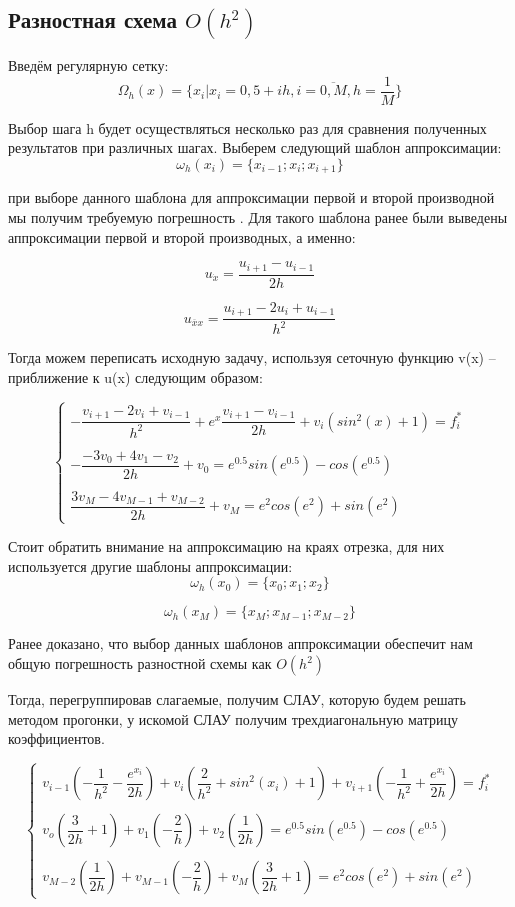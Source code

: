 \documentclass[12pt]{article}
\begin{document}
\subsection{Разностная схема $O(h^2)$}
Введём регулярную сетку:
$$
\Omega_h(x) = \{x_i | x_i = 0,5 + ih, i = \overline{0, M}, h = \dfrac{1}{M}\}
$$

Выбор шага h будет осуществляться несколько раз для сравнения полученных результатов при различных шагах.
Выберем следующий шаблон аппроксимации:
$$
\omega_h(x_i) = \{ x_{i-1}; x_i; x_{i + 1}\}
$$

при выборе данного шаблона для аппроксимации первой и второй производной  мы получим требуемую погрешность . Для такого шаблона ранее были выведены аппроксимации первой и второй производных, а именно:

$$
u_{\dot{x}} = \dfrac{u_{i + 1} - u_{i - 1}}{2h}
$$

$$
u_{\overline{x}x} = \dfrac{u_{i + 1} -2u_i+ u_{i - 1}}{h^2}
$$

Тогда можем переписать исходную задачу, используя сеточную функцию v(x) – приближение к u(x) следующим образом:

$$
\begin{cases}
-\dfrac{v_{i+1} - 2v_i + v_{i-1}}{h^2} + e^x\dfrac{v_{i+1} - v_{i-1}}{2h} + v_i(sin^2(x) + 1) = f_i^* \\
\\
- \dfrac{-3v_0 + 4v_1 - v_2}{2h} + v_0 = e^{0.5}sin(e^{0.5}) - cos(e^{0.5}) \\
\\
\dfrac{3v_M - 4v_{M-1} + v_{M-2}}{2h} + v_M = e^2cos(e^2) + sin(e^2)
\end{cases}
$$

Стоит обратить внимание на аппроксимацию на краях отрезка, для них используется другие шаблоны аппроксимации:
$$
\omega_h(x_0) = \{ x_{0}; x_{1}; x_{2}\}
$$

$$
\omega_h(x_M) = \{ x_M; x_{M - 1}; x_{M - 2}\}
$$

Ранее доказано, что выбор данных шаблонов аппроксимации обеспечит нам общую погрешность разностной схемы как 
$O(h^2)$

Тогда, перегруппировав слагаемые, получим СЛАУ, которую будем решать методом прогонки, у искомой СЛАУ получим трехдиагональную матрицу коэффициентов.

$$
\begin{cases}
v_{i-1}(-\dfrac{1}{h^2} - \dfrac{e^{x_i}}{2h}) + v_i(\dfrac{2}{h^2} + sin^2(x_i) + 1) + v_{i + 1}(-\dfrac{1}{h^2} + \dfrac{e^{x_i}}{2h}) = f_i^*\\
\\
v_o(\dfrac{3}{2h}  +1) + v_1(-\dfrac{2}{h}) + v_2(\dfrac{1}{2h}) = e^{0.5}sin(e^{0.5}) - cos(e^{0.5})\\
\\
v_{M-2}(\dfrac{1}{2h}) + v_{M-1}(-\dfrac{2}{h})  +v_M(\dfrac{3}{2h} + 1) = e^2cos(e^2) + sin(e^2)
\end{cases}
$$
\end{document}
